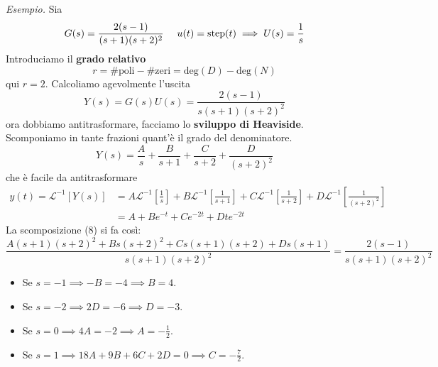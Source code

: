 \textit{Esempio.} Sia
\begin{equation*}
	G(s) =\frac{2(s-1)}{(s+1)(s+2)^2} \ \ \ \ u(t) =\operatorname{step}(t) \implies U(s) =\frac{1}{s}
\end{equation*}
Introduciamo il \textbf{grado relativo}
\begin{equation*}
	\boxed{r=\#\text{poli} -\#\text{zeri} =\mathrm{deg}(D) -\mathrm{deg}(N)}
\end{equation*}
qui $r=2$. Calcoliamo agevolmente l'uscita
\begin{equation*}
	Y(s) =G(s) U(s) =\frac{2(s-1)}{s(s+1)(s+2)^2}
\end{equation*}
ora dobbiamo antitrasformare, facciamo lo \textbf{sviluppo di Heaviside}. Scomponiamo in tante frazioni quant'è il grado del denominatore.
\begin{equation}
	Y(s)=\frac{A}{s} +\frac{B}{s+1} +\frac{C}{s+2} +\frac{D}{(s+2)^2}
\end{equation}
che è facile da antitrasformare
\begin{equation*}
	\begin{aligned}
		y(t) =\mathcal{L}^{-1}[ Y(s)] & =A\mathcal{L}^{-1}\left[\frac{1}{s}\right] +B\mathcal{L}^{-1}\left[\frac{1}{s+1}\right] +C\mathcal{L}^{-1}\left[\frac{1}{s+2}\right] +D\mathcal{L}^{-1}\left[\frac{1}{(s+2)^2}\right] \\
		                              & =A+Be^{-t} +Ce^{-2t} +Dte^{-2t}                                                                                                                                                       
	\end{aligned}
\end{equation*}
La scomposizione (8) si fa così:
\begin{equation*}
	\frac{A(s+1)(s+2)^2 +Bs(s+2)^2 +Cs(s+1)(s+2)+Ds(s+1)}{s(s+1)(s+2)^2} =\frac{2(s-1)}{s(s+1)(s+2)^2}
\end{equation*}
\begin{itemize}
	\item Se $s=-1\implies -B=-4\implies B=4$.
	\item Se $s=-2\implies 2D=-6\implies D=-3$.
	\item Se $s=0\implies 4A=-2\implies A=-\frac{1}{2}$.
	\item Se $s=1\implies 18A+9B+6C+2D=0\implies C=-\frac{7}{2}$.
\end{itemize}

